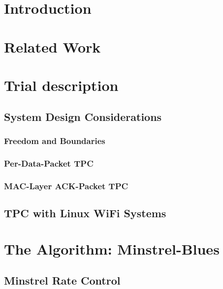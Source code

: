 \documentclass{sig-alternate}
\begin{document}
	\section{Introduction}

	\section{Related Work}
	\label{s:related}

	\section{Trial description}
	\label{s:trial-descr} 

		\subsection{System Design Considerations}
		\label{s:system-design}

			\subsubsection{Freedom and Boundaries}
			\label{s:freedom-boundaries}

			\subsubsection{Per-Data-Packet TPC}
			\label{s:tpc-data}

			\subsubsection{MAC-Layer ACK-Packet TPC}
			\label{s:tpc-ack}

		\subsection{TPC with Linux WiFi Systems}
		\label{s:todays-wifi-systems}


	\section{The Algorithm: Minstrel-Blues}
	\label{s:minstrel-blues}

		\subsection{Minstrel Rate Control}
		\label{s:minstrel-rate}
\end{document}
